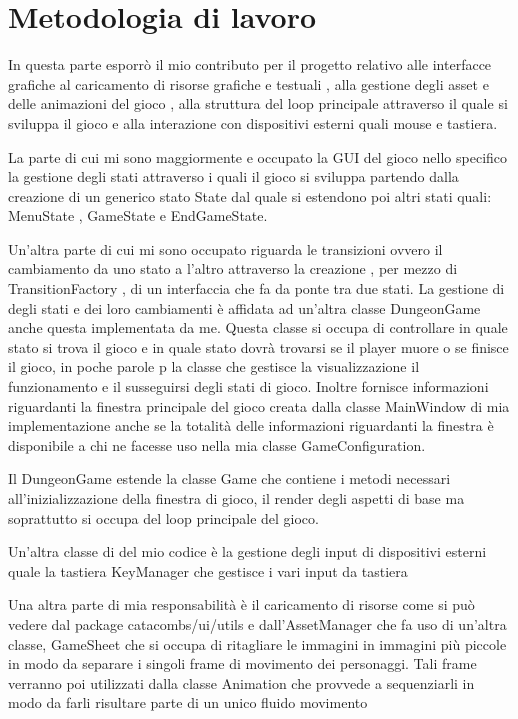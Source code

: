 \documentclass[a4paper,12pt]{report}
\begin{document}
    \section{Metodologia di lavoro}
    \par In questa parte esporrò il mio contributo per il progetto relativo alle interfacce grafiche al caricamento di risorse grafiche
    e testuali , alla gestione degli asset e delle animazioni del gioco , alla struttura del loop principale attraverso il quale si
    sviluppa il gioco e alla interazione con dispositivi esterni quali mouse e tastiera.
    \par La parte di cui mi sono maggiormente e occupato la GUI del gioco nello specifico la gestione degli stati attraverso i quali
    il gioco si sviluppa partendo dalla creazione di un generico stato State dal quale si estendono poi altri stati quali:
    MenuState , GameState e EndGameState.
    \par Un’altra parte di cui mi sono occupato riguarda le transizioni ovvero il cambiamento da uno stato a l’altro attraverso la creazione
    , per mezzo di  TransitionFactory , di un interfaccia che fa da ponte tra due stati. La gestione di degli stati e dei loro
    cambiamenti è affidata ad un'altra classe DungeonGame anche questa implementata da me. Questa classe si occupa di controllare
    in quale stato si trova il gioco e in quale stato dovrà trovarsi se il player muore o se finisce il gioco, in poche parole p la
    classe che gestisce la visualizzazione il funzionamento e il susseguirsi degli stati di gioco. Inoltre fornisce informazioni
    riguardanti la finestra principale del gioco creata dalla classe MainWindow di mia implementazione anche se la totalità delle
    informazioni riguardanti la finestra è disponibile a chi  ne facesse uso nella mia classe GameConfiguration.
    \par Il DungeonGame estende la classe Game che contiene i metodi necessari all’inizializzazione della finestra di gioco,
    il render degli aspetti di base ma soprattutto si occupa del loop principale del gioco.
    \par Un’altra classe di del mio codice è la gestione degli input di dispositivi esterni quale la tastiera KeyManager che
    gestisce i vari input da tastiera
    \par Una altra parte di mia responsabilità è il caricamento di risorse come si può vedere dal package catacombs/ui/utils
    e dall’AssetManager che fa uso di un’altra classe, GameSheet che si occupa di ritagliare le immagini in immagini più piccole
    in modo da separare i singoli frame di movimento dei personaggi. Tali frame verranno poi utilizzati dalla classe Animation che
    provvede a sequenziarli in modo da farli risultare parte di un unico fluido movimento
\end{document}
